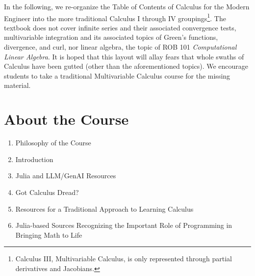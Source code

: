 In the following, we re-organize the Table of Contents of Calculus for the Modern Engineer into the more traditional Calculus I through IV groupings\footnote{Calculus III, Multivariable Calculus, is only represented through partial derivatives and Jacobians.}. The textbook does not cover infinite series and their associated convergence tests, multivariable integration and its associated topics of Green's functions, divergence, and curl,  nor linear algebra, the topic of ROB 101 \textit{Computational Linear Algebra}. It is hoped that this layout will allay fears that whole swaths of Calculus have been gutted (other than the aforementioned topics). We encourage students to take a traditional Multivariable Calculus course for the missing material. \\

\section*{About the Course}
\begin{enumerate}
\item Philosophy of the Course
  \item Introduction 
  \item Julia and LLM/GenAI Resources 
  \item Got Calculus Dread?
  \item Resources for a Traditional Approach to Learning Calculus 
  \item Julia-based Sources Recognizing the Important Role of Programming in Bringing Math to Life 
\end{enumerate}

